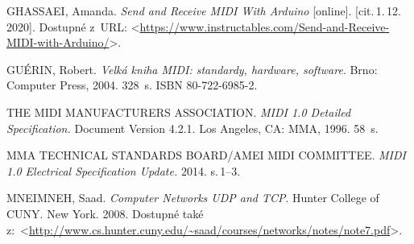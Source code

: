

\begin{thebibliography}{99}

    GHASSAEI, Amanda. \emph{Send and Receive MIDI With Arduino}\/ [online]. [cit.\,1.\,12.\,2020]. Dostupné z~URL: <\url{https://www.instructables.com/Send-and-Receive-MIDI-with-Arduino/}>.

    GUÉRIN, Robert. \emph{Velká kniha MIDI: standardy, hardware, software}. Brno: Computer Press, 2004. 328~s. ISBN 80-722-6985-2.

    THE MIDI MANUFACTURERS ASSOCIATION. \emph{MIDI 1.0 Detailed Specification.} Document Version 4.2.1. Los Angeles, CA: MMA, 1996. 58~s.

    MMA TECHNICAL STANDARDS BOARD/AMEI MIDI COMMITTEE. \emph{MIDI 1.0 Electrical Specification Update.} 2014. s.\,1--3. 

    MNEIMNEH, Saad. \emph{Computer Networks UDP and TCP}. Hunter College of CUNY. New York. 2008. Dostupné také z:~<\url{http://www.cs.hunter.cuny.edu/~saad/courses/networks/notes/note7.pdf}>.




	




\end{thebibliography}
